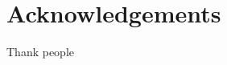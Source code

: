 \documentclass[class=report, crop=false]{standalone}
\begin{document}
\chapter{Acknowledgements}\label{cha:acknowledgements}
Thank people
\end{document}
